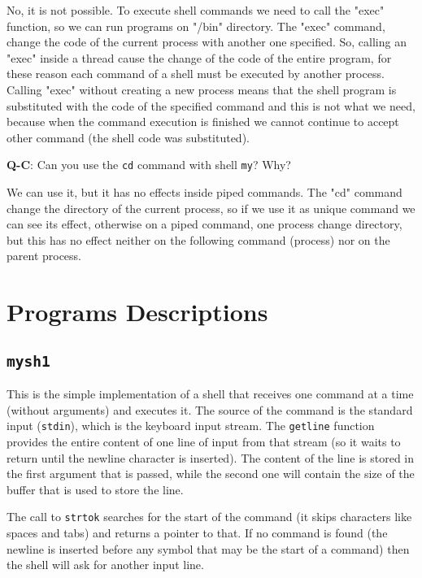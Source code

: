 No, it is not possible. To execute shell commands we need to call the "exec" function, so we can run programs on "/bin" directory. The "exec" command, change the code of the current process with another one specified. So, calling an "exec" inside a thread cause the change of the code of the entire program, for these reason each command of a shell must be executed by another process. Calling "exec" without creating a new process means that the shell program is substituted with the code of the specified command and this is not what we need, because when the command execution is finished we cannot continue to accept other command (the shell code was substituted). \newline


\textbf{Q-C}: Can you use the \texttt{cd} command with shell \texttt{my}? Why?\newline

We can use it, but it has no effects inside piped commands. The "cd" command change the directory of the current process, so if we use it as unique command we can see its effect, otherwise on a piped command, one process change directory, but this has no effect neither on the following command (process) nor on the parent process.\newline


\section{Programs Descriptions}
\subsection{\texttt{mysh1}}
This is the simple implementation of a shell that receives one command at a time (without arguments) and executes it. The source of the command is the standard input (\texttt{stdin}), which is the keyboard input stream. The \texttt{getline} function provides the entire content of one line of input from that stream (so it waits to return until the newline character is inserted). The content of the line is stored in the first argument that is passed, while the second one will contain the size of the buffer that is used to store the line. \newline

The call to \texttt{strtok} searches for the start of the command (it skips characters like spaces and tabs) and returns a pointer to that. If no command is found (the newline is inserted before any symbol that may be the start of a command) then the shell will ask for another input line. \newline

